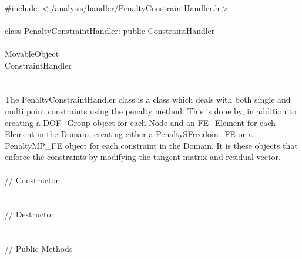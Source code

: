 
   \\
\indent \#include $<\tilde{
}$/analysis/handler/PenaltyConstraintHandler.h$>$  \\ 

  \\
\indent class PenaltyConstraintHandler: public ConstraintHandler  \\

 \\
\indent MovableObject \\
\indent\indent ConstraintHandler \\
\indent\indent{} \\

 \\ 
\indent The PenaltyConstraintHandler class is a class which deals with
both single and multi point constraints using the penalty method. 
This is done by, in addition to creating a DOF\_Group object
for each Node and an FE\_Element for each Element in the Domain,
creating either a PenaltySFreedom\_FE or a PenaltyMP\_FE object for each
constraint in the Domain. It is these objects that enforce the
constraints by modifying the tangent matrix and residual vector. \\ 


 \\
\indent // Constructor \\
\\  \\ 
\indent // Destructor \\
\\  \\
\indent // Public Methods\\
 \\ 
 \\ \\
 \\
 \\


